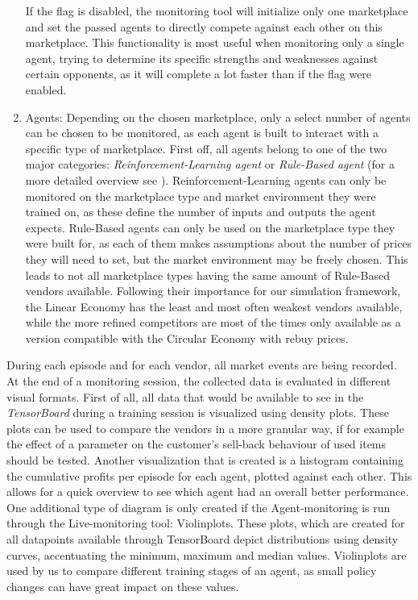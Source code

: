 \begin{enumerate}
	If the flag is disabled, the monitoring tool will initialize only one marketplace and set the passed agents to directly compete against each other on this marketplace. This functionality is most useful when monitoring only a single agent, trying to determine its specific strengths and weaknesses against certain opponents, as it will complete a lot faster than if the flag were enabled.
	\item Agents: Depending on the chosen marketplace, only a select number of agents can be chosen to be monitored, as each agent is built to interact with a specific type of marketplace. First off, all agents belong to one of the two major categories: \emph{Reinforcement-Learning agent} or \emph{Rule-Based agent} (for a more detailed overview see ). Reinforcement-Learning agents can only be monitored on the marketplace type and market environment they were trained on, as these define the number of inputs and outputs the agent expects. Rule-Based agents can only be used on the marketplace type they were built for, as each of them makes assumptions about the number of prices they will need to set, but the market environment may be freely chosen. This leads to not all marketplace types having the same amount of Rule-Based vendors available. Following their importance for our simulation framework, the Linear Economy has the least and most often weakest vendors available, while the more refined competitors are most of the times only available as a version compatible with the Circular Economy with rebuy prices.
\end{enumerate}

During each episode and for each vendor, all market events are being recorded. At the end of a monitoring session, the collected data is evaluated in different visual formats. First of all, all data that would be available to see in the \emph{TensorBoard} during a training session is visualized using density plots. These plots can be used to compare the vendors in a more granular way, if for example the effect of a parameter on the customer's sell-back behaviour of used items should be tested. Another visualization that is created is a histogram containing the cumulative profits per episode for each agent, plotted against each other. This allows for a quick overview to see which agent had an overall better performance. One additional type of diagram is only created if the Agent-monitoring is run through the Live-monitoring tool: Violinplots. These plots, which are created for all datapoints available through TensorBoard depict distributions using density curves, accentuating the minimum, maximum and median values. Violinplots are used by us to compare different training stages of an agent, as small policy changes can have great impact on these values.

